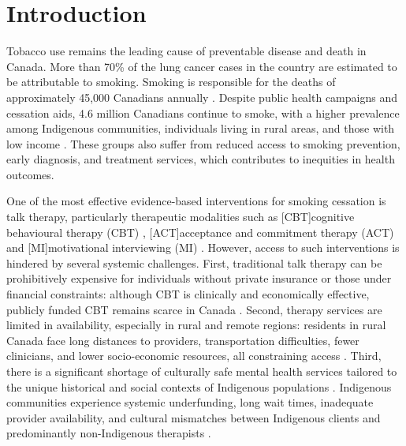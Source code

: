 \chapter{Introduction}


Tobacco use remains the leading cause of preventable disease and death in Canada. More than 70\% of the lung cancer cases in the country are estimated to be attributable to smoking. Smoking is responsible for the deaths of approximately 45,000 Canadians annually \citep{poirier2019estimates}. Despite public health campaigns and cessation aids, 4.6 million Canadians continue to smoke, with a higher prevalence among Indigenous communities, individuals living in rural areas, and those with low income \cite{cpac2020lung}. These groups also suffer from reduced access to smoking prevention, early diagnosis, and treatment services, which contributes to inequities in health outcomes.

One of the most effective evidence-based interventions for smoking cessation is talk therapy, particularly therapeutic modalities such as [CBT]cognitive behavioural therapy (CBT) \cite{beck2011cognitive}, [ACT]acceptance and commitment therapy (ACT) \cite{hayes1999acceptance} and [MI]motivational interviewing (MI) \cite{miller2012motivational}. However, access to such interventions is hindered by several systemic challenges. First, traditional talk therapy can be prohibitively expensive for individuals without private insurance or those under financial constraints: although CBT is clinically and economically effective, publicly funded CBT remains scarce in Canada \cite{llewellyn2017economic}. Second, therapy services are limited in availability, especially in rural and remote regions: residents in rural Canada face long distances to providers, transportation difficulties, fewer clinicians, and lower socio-economic resources, all constraining access \cite{crosato2011rural}. Third, there is a significant shortage of culturally safe mental health services tailored to the unique historical and social contexts of Indigenous populations \cite{jones2021mental}. Indigenous communities experience systemic underfunding, long wait times, inadequate provider availability, and cultural mismatches between Indigenous clients and predominantly non-Indigenous therapists \cite{firstnationshealth2023, turner2018poverty}.


